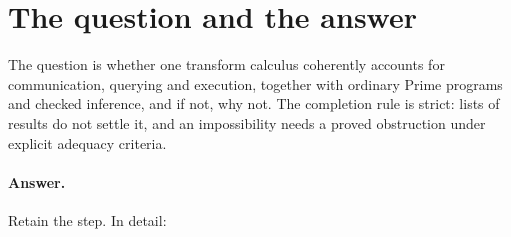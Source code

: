 \documentclass[11pt]{article}
\theoremstyle{remark}
\begin{document}
\tableofcontents

\section{The question and the answer}

The question is whether one transform calculus coherently accounts for communication, querying and
execution, together with ordinary Prime programs and checked inference, and if not, why not. The
completion rule is strict: lists of results do not settle it, and an impossibility needs a proved
obstruction under explicit adequacy criteria.

\paragraph{Answer.} Retain the step. In detail:
\end{document}
